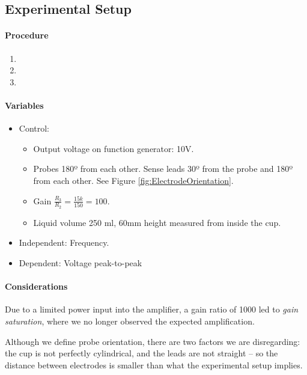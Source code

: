 \subsection{Experimental Setup}
\paragraph{Procedure}
\begin{enumerate}
	\item 
	\item 
	\item 
\end{enumerate}
\paragraph{Variables}
\begin{itemize}
	\item Control:
		\begin{itemize}
			\item Output voltage on function generator: 10V.
			\item Probes 180º from each other. Sense leads 30º from the probe and 180º from each other. See Figure \ref{fig:ElectrodeOrientation}.
			\item Gain $\frac{R_3}{R_2} = \frac{15k}{150} = 100$.
			\item Liquid volume 250 ml, 60mm height measured from inside the cup.
		\end{itemize}
	\item Independent: Frequency.
	\item Dependent: Voltage peak-to-peak
\end{itemize}

\paragraph{Considerations}

Due to a limited power input into the amplifier, a gain ratio of 1000 led to \textit{gain saturation}, where we no longer observed the expected amplification.

Although we define probe orientation, there are two factors we are disregarding: the cup is not perfectly cylindrical, and the leads are not straight -- so the distance between electrodes is smaller than what the experimental setup implies.


